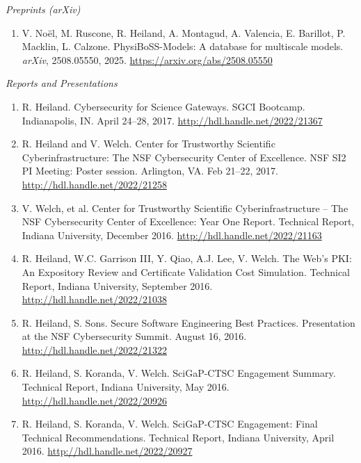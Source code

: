 \documentclass[11pt]{article}
\begin{document}
\textit{Preprints (arXiv)}

\begin{enumerate}[leftmargin=*, itemsep=3pt, topsep=4pt]
    \item V. No\"el, M. Ruscone, R. Heiland, A. Montagud, A. Valencia, E. Barillot, P. Macklin, L. Calzone. PhysiBoSS-Models: A database for multiscale models. \textit{arXiv}, 2508.05550, 2025. \url{https://arxiv.org/abs/2508.05550}
\end{enumerate}

\textit{Reports and Presentations}

\begin{enumerate}[leftmargin=*, itemsep=3pt, topsep=4pt]
    \item R. Heiland. Cybersecurity for Science Gateways. SGCI Bootcamp. Indianapolis, IN. April 24--28, 2017. \url{http://hdl.handle.net/2022/21367}

    \item R. Heiland and V. Welch. Center for Trustworthy Scientific Cyberinfrastructure: The NSF Cybersecurity Center of Excellence. NSF SI2 PI Meeting: Poster session. Arlington, VA. Feb 21--22, 2017. \url{http://hdl.handle.net/2022/21258}

    \item V. Welch, et al. Center for Trustworthy Scientific Cyberinfrastructure -- The NSF Cybersecurity Center of Excellence: Year One Report. Technical Report, Indiana University, December 2016. \url{http://hdl.handle.net/2022/21163}

    \item R. Heiland, W.C. Garrison III, Y. Qiao, A.J. Lee, V. Welch. The Web's PKI: An Expository Review and Certificate Validation Cost Simulation. Technical Report, Indiana University, September 2016. \url{http://hdl.handle.net/2022/21038}

    \item R. Heiland, S. Sons. Secure Software Engineering Best Practices. Presentation at the NSF Cybersecurity Summit. August 16, 2016. \url{http://hdl.handle.net/2022/21322}

    \item R. Heiland, S. Koranda, V. Welch. SciGaP-CTSC Engagement Summary. Technical Report, Indiana University, May 2016. \url{http://hdl.handle.net/2022/20926}

    \item R. Heiland, S. Koranda, V. Welch. SciGaP-CTSC Engagement: Final Technical Recommendations. Technical Report, Indiana University, April 2016. \url{http://hdl.handle.net/2022/20927}


\end{enumerate}
\end{document}
